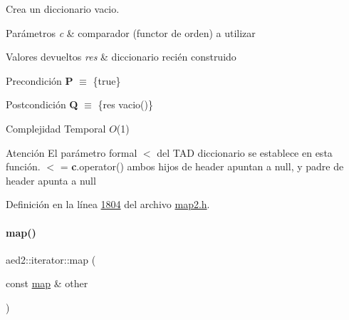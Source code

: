 Crea un diccionario vacio. 


\begin{DoxyParams}{Parámetros}
{\em c} & comparador (functor de orden) a utilizar \\
\hline
\end{DoxyParams}

\begin{DoxyRetVals}{Valores devueltos}
{\em res} & diccionario recién construido\\
\hline
\end{DoxyRetVals}
\begin{DoxyPrecond}{Precondición}
{\bfseries P} $\equiv$ \{true\} 
\end{DoxyPrecond}
\begin{DoxyPostcond}{Postcondición}
{\bfseries Q} $\equiv$ \{res  vacio()\}
\end{DoxyPostcond}

\begin{DoxyDescription}
\item[Complejidad Temporal]$O$(1)
\end{DoxyDescription}

\begin{DoxyAttention}{Atención}
El parámetro formal $<$ del T\+AD diccionario se establece en esta función. $<$ = {\bfseries c}.operator() ambos hijos de header apuntan a null, y padre de header apunta a null 
\end{DoxyAttention}


Definición en la línea \hyperlink{map2_8h_source_l01804}{1804} del archivo \hyperlink{map2_8h_source}{map2.\+h}.

\mbox{\label{classaed2_1_1iterator_aee42bcaf809b71168f4266e1d05971e2_aee42bcaf809b71168f4266e1d05971e2}} 
\paragraph{\texorpdfstring{map()}{map()}\hspace{0.1cm}{\footnotesize\ttfamily [2/3]}}
{\footnotesize\ttfamily aed2\+::iterator\+::map (\begin{DoxyParamCaption}\item[{const \hyperlink{classaed2_1_1map}{map} \&}]{other }\end{DoxyParamCaption})\hspace{0.3cm}{\ttfamily [inline]}}

